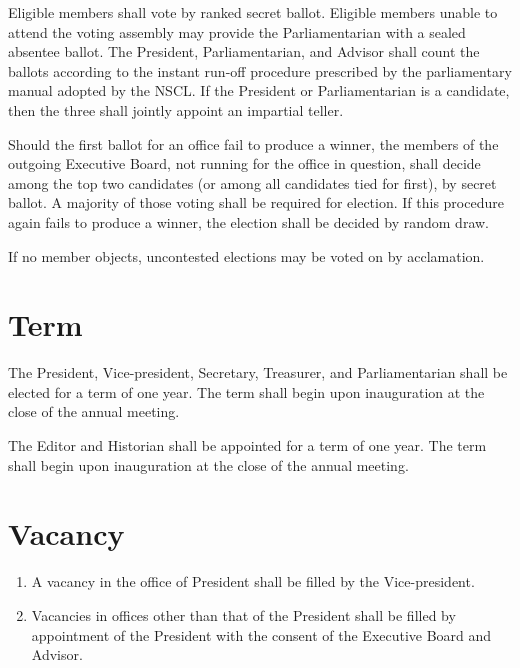 \documentclass{bylaws_nofont}
\newcommand{\NSCL}{\textsc{NSCL}\xspace}
\begin{document}
\begin{linenumbers}[1]
\begin{enumerate}
    \sub[Voting] Eligible members shall vote by ranked secret
    ballot. Eligible members unable to attend the voting assembly may
    provide the Parliamentarian with a sealed absentee ballot. The
    President, Parliamentarian, and Advisor shall count the ballots
    according to the instant run-off procedure prescribed by the
    parliamentary manual adopted by the \NSCL. If the President or
    Parliamentarian is a candidate, then the three shall jointly appoint
    an impartial teller.
    
    \sub[No Election] Should the first ballot for an office fail to
    produce a winner, the members of the outgoing Executive Board, not
    running for the office in question, shall decide among the top two
    candidates (or among all candidates tied for first), by secret
    ballot. A majority of those voting shall be required for
    election. If this procedure again fails to produce a winner, the
    election shall be decided by random draw.
    
     If no member objects, uncontested
    elections may be voted on by acclamation.\\
  \end{enumerate}

  \section{Term}
  \begin{enumerate}
     The President, Vice-president, Secretary,
    Treasurer, and Parliamentarian shall be elected for a term of one
    year. The term shall begin upon inauguration at the close of the
    annual meeting.
    
     The Editor and Historian shall be
    appointed for a term of one year. The term shall begin upon
    inauguration at the close of the annual meeting.\\
  \end{enumerate}

  \section{Vacancy}
  \begin{enumerate}
  \item A vacancy in the office of President shall be filled by the
    Vice-president.
  \item Vacancies in offices other than that of the President shall be
    filled by appointment of the President with the consent of the
    Executive Board and Advisor.\\
  \end{enumerate}


\end{linenumbers}
\end{document}
